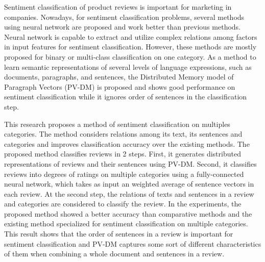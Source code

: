 Sentiment classification of product reviews is important
for marketing in companies.
%
Nowadays, for sentiment classification problems,
several methods using neural network are proposed
and work better than previous methods.
Neural network is capable to extract and utilize complex relations
among factors in input features for sentiment classification.
However, these methods are mostly proposed
for binary or multi-class classification on one category.
%
As a method to learn semantic representations of several levels
of language expressions, such as documents, paragraphs, and sentences,
the Distributed Memory model of Paragraph Vectors (PV-DM) is proposed
and shows good performance on sentiment classification
while it ignores order of sentences in the classification step.

This research proposes a method of sentiment classification
on multiples categories.
The method considers relations among its text, its sentences and categories
and improves classification accuracy over the existing methods.
%
The proposed method classifies reviews in 2 steps.
First, it generates distributed representations of reviews
and their sentences using PV-DM.
Second, it classifies reviews into degrees of ratings
on multiple categories using a fully-connected neural network,
which takes as input an weighted average of
sentence vectors in each review.
At the second step, the relations of texts and sentences in a review
and categories are considered to classify the review.
%
In the experiments, the proposed method showed a better accuracy
than comparative methods and the existing method specialized
for sentiment classification on multiple categories.
This result shows that
the order of sentences in a review is important for sentiment classification
and PV-DM captures some sort of different characteristics of them
when combining a whole document and sentences in a review.
